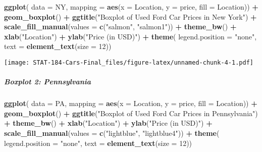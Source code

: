 \documentclass[
]{article}
\newenvironment{Shaded}{\begin{snugshade}}{\end{snugshade}}
\newcommand{\AttributeTok}[1]{\textcolor[rgb]{0.13,0.29,0.53}{#1}}
\newcommand{\DecValTok}[1]{\textcolor[rgb]{0.00,0.00,0.81}{#1}}
\newcommand{\FunctionTok}[1]{\textcolor[rgb]{0.13,0.29,0.53}{\textbf{#1}}}
\newcommand{\NormalTok}[1]{#1}
\newcommand{\SpecialCharTok}[1]{\textcolor[rgb]{0.81,0.36,0.00}{\textbf{#1}}}
\newcommand{\StringTok}[1]{\textcolor[rgb]{0.31,0.60,0.02}{#1}}
\begin{document}
\begin{Shaded}
\begin{Highlighting}[]
\FunctionTok{ggplot}\NormalTok{(}
\AttributeTok{data =}\NormalTok{ NY,}
\AttributeTok{mapping =} \FunctionTok{aes}\NormalTok{(}\AttributeTok{x =}\NormalTok{ Location, }\AttributeTok{y =}\NormalTok{ price, }\AttributeTok{fill =}\NormalTok{ Location)) }\SpecialCharTok{+}
  \FunctionTok{geom\_boxplot}\NormalTok{() }\SpecialCharTok{+}
  \FunctionTok{ggtitle}\NormalTok{(}\StringTok{"Boxplot of Used Ford Car Prices in New York"}\NormalTok{) }\SpecialCharTok{+}
  \FunctionTok{scale\_fill\_manual}\NormalTok{(}\AttributeTok{values =} \FunctionTok{c}\NormalTok{(}\StringTok{"salmon"}\NormalTok{, }\StringTok{"salmon1"}\NormalTok{)) }\SpecialCharTok{+}
  \FunctionTok{theme\_bw}\NormalTok{() }\SpecialCharTok{+}
  \FunctionTok{xlab}\NormalTok{(}\StringTok{"Location"}\NormalTok{) }\SpecialCharTok{+}
  \FunctionTok{ylab}\NormalTok{(}\StringTok{"Price (in USD)"}\NormalTok{) }\SpecialCharTok{+}
  \FunctionTok{theme}\NormalTok{(}
  \AttributeTok{legend.position =} \StringTok{"none"}\NormalTok{,}
  \AttributeTok{text =} \FunctionTok{element\_text}\NormalTok{(}\AttributeTok{size =} \DecValTok{12}\NormalTok{))}
\end{Highlighting}
\end{Shaded}

\texttt{[image: STAT-184-Cars-Final\_files/figure-latex/unnamed-chunk-4-1.pdf]}

\hypertarget{boxplot-2-pennsylvania}{%
\subparagraph{Boxplot 2: Pennsylvania}\label{boxplot-2-pennsylvania}}

\begin{Shaded}
\begin{Highlighting}[]
\FunctionTok{ggplot}\NormalTok{(}
\AttributeTok{data =}\NormalTok{ PA,}
\AttributeTok{mapping =} \FunctionTok{aes}\NormalTok{(}\AttributeTok{x =}\NormalTok{ Location, }\AttributeTok{y =}\NormalTok{ price, }\AttributeTok{fill =}\NormalTok{ Location)) }\SpecialCharTok{+}
  \FunctionTok{geom\_boxplot}\NormalTok{() }\SpecialCharTok{+}
  \FunctionTok{ggtitle}\NormalTok{(}\StringTok{"Boxplot of Used Ford Car Prices in Pennsylvania"}\NormalTok{) }\SpecialCharTok{+}
  \FunctionTok{theme\_bw}\NormalTok{() }\SpecialCharTok{+}
  \FunctionTok{xlab}\NormalTok{(}\StringTok{"Location"}\NormalTok{) }\SpecialCharTok{+}
  \FunctionTok{ylab}\NormalTok{(}\StringTok{"Price (in USD)"}\NormalTok{) }\SpecialCharTok{+}
  \FunctionTok{scale\_fill\_manual}\NormalTok{(}\AttributeTok{values =} \FunctionTok{c}\NormalTok{(}\StringTok{"lightblue"}\NormalTok{, }\StringTok{"lightblue4"}\NormalTok{)) }\SpecialCharTok{+}
  \FunctionTok{theme}\NormalTok{(}
  \AttributeTok{legend.position =} \StringTok{"none"}\NormalTok{,}
  \AttributeTok{text =} \FunctionTok{element\_text}\NormalTok{(}\AttributeTok{size =} \DecValTok{12}\NormalTok{))}
\end{Highlighting}
\end{Shaded}
\end{document}
